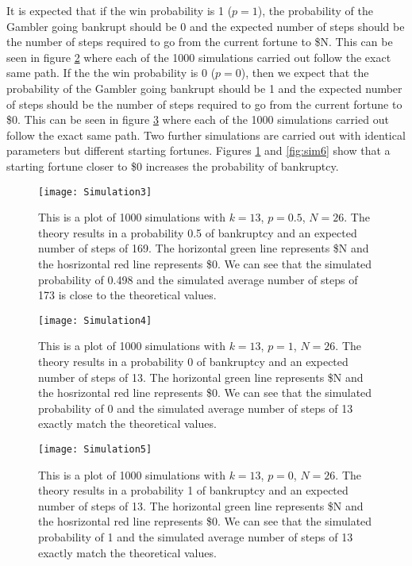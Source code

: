 \documentclass{article}
\begin{document}
It is expected that if the win probability is 1 ($p=1$), the probability of the Gambler going bankrupt should be 0 and the expected number of steps should be the number of steps required to go from the current fortune to \$N. This can be seen in figure \ref{fig:sim4} where each of the 1000 simulations carried out follow the exact same path. If the the win probability is 0 ($p=0$), then we expect that the probability of the Gambler going bankrupt should be 1 and the expected number of steps should be the number of steps required to go from the current fortune to \$0. This can be seen in figure \ref{fig:sim5} where each of the 1000 simulations carried out follow the exact same path. Two further simulations are carried out with identical parameters but different starting fortunes. Figures \ref{fig:sim3} and \ref{fig:sim6} show that a starting fortune closer to \$0 increases the probability of bankruptcy.

\begin{figure}[r]
    \centering
    \texttt{[image: Simulation3]}
    \caption{This is a plot of 1000 simulations with $k = 13$, $p = 0.5$, $N = 26$. The theory results in a probability 0.5 of bankruptcy and an expected number of steps of 169. The horizontal green line represents \$N and the hosrizontal red line represents \$0. We can see that the simulated probability of 0.498 and the simulated average number of steps of 173 is close to the theoretical values.}
    \label{fig:sim3}
\end{figure}

\begin{figure}[r]
    \centering
    \texttt{[image: Simulation4]}
    \caption{This is a plot of 1000 simulations with $k = 13$, $p = 1$, $N = 26$. The theory results in a probability 0 of bankruptcy and an expected number of steps of 13. The horizontal green line represents \$N and the hosrizontal red line represents \$0. We can see that the simulated probability of 0 and the simulated average number of steps of 13 exactly match the theoretical values.}
    \label{fig:sim4}
\end{figure}

\begin{figure}[r]
    \centering
    \texttt{[image: Simulation5]}
    \caption{This is a plot of 1000 simulations with $k = 13$, $p = 0$, $N = 26$. The theory results in a probability 1 of bankruptcy and an expected number of steps of 13. The horizontal green line represents \$N and the hosrizontal red line represents \$0. We can see that the simulated probability of 1 and the simulated average number of steps of 13 exactly match the theoretical values.}
    \label{fig:sim5}
\end{figure}
\end{document}
